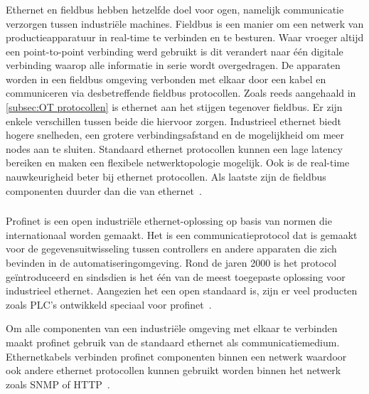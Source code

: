 \subsubsection{}
\label{subsubsec:Verschil ethernet en fieldbus+}
Ethernet en fieldbus hebben hetzelfde doel voor ogen, namelijk communicatie verzorgen tussen industriële machines. Fieldbus is een manier om een netwerk van productieapparatuur in real-time te verbinden en te besturen. Waar vroeger altijd een point-to-point verbinding werd gebruikt is dit verandert naar één digitale verbinding waarop alle informatie in serie wordt overgedragen. De apparaten worden in een fieldbus omgeving verbonden met elkaar door een kabel en communiceren via desbetreffende fieldbus protocollen. Zoals reeds aangehaald in \ref{subsec:OT protocollen} is ethernet aan het stijgen tegenover fieldbus. Er zijn enkele verschillen tussen beide die hiervoor zorgen. Industrieel ethernet biedt hogere snelheden, een grotere verbindingsafstand en de mogelijkheid om meer nodes aan te sluiten. Standaard ethernet protocollen kunnen een lage latency bereiken en maken een flexibele netwerktopologie mogelijk. Ook is de real-time nauwkeurigheid beter bij ethernet protocollen. Als laatste zijn de fieldbus componenten duurder dan die van ethernet~\autocite{Chemigraphic2019}.



\subsubsection{}
\label{subsubsec:Profinet}
Profinet is een open industriële ethernet-oplossing op basis van normen die internationaal worden gemaakt. Het is een communicatieprotocol dat is gemaakt voor de gegevensuitwisseling tussen controllers en andere apparaten die zich bevinden in de automatiseringomgeving. Rond de jaren 2000 is het protocol geïntroduceerd en sindsdien is het één van de meest toegepaste oplossing voor industrieel ethernet. Aangezien het een open standaard is, zijn er veel producten zoals PLC's ontwikkeld speciaal voor profinet~\autocite{Nelly2021}.

Om alle componenten van een industriële omgeving met elkaar te verbinden maakt profinet gebruik van de standaard ethernet als communicatiemedium. Ethernetkabels verbinden profinet componenten binnen een netwerk waardoor ook andere ethernet protocollen kunnen gebruikt worden binnen het netwerk zoals SNMP of HTTP~\autocite{Nelly2021}.

